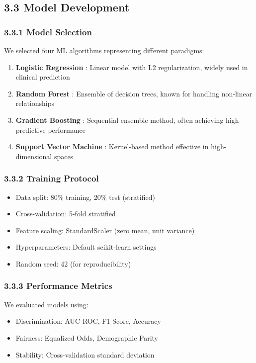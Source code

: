 \documentclass[12pt,a4paper]{article}
\begin{document}
\subsection{3.3 Model Development}

\subsubsection{3.3.1 Model Selection}

We selected four ML algorithms representing different paradigms:

\begin{enumerate}
    \item \textbf{Logistic Regression} \cite{cox1958}: Linear model with L2 
          regularization, widely used in clinical prediction
    \item \textbf{Random Forest} \cite{breiman2001}: Ensemble of decision 
          trees, known for handling non-linear relationships
    \item \textbf{Gradient Boosting} \cite{friedman2001}: Sequential ensemble 
          method, often achieving high predictive performance
    \item \textbf{Support Vector Machine} \cite{vapnik1995}: Kernel-based 
          method effective in high-dimensional spaces
\end{enumerate}

\subsubsection{3.3.2 Training Protocol}

\begin{itemize}
    \item Data split: 80\% training, 20\% test (stratified)
    \item Cross-validation: 5-fold stratified
    \item Feature scaling: StandardScaler (zero mean, unit variance)
    \item Hyperparameters: Default scikit-learn settings
    \item Random seed: 42 (for reproducibility)
\end{itemize}

\subsubsection{3.3.3 Performance Metrics}

We evaluated models using:
\begin{itemize}
    \item Discrimination: AUC-ROC, F1-Score, Accuracy
    \item Fairness: Equalized Odds, Demographic Parity
    \item Stability: Cross-validation standard deviation
\end{itemize}
\end{document}
